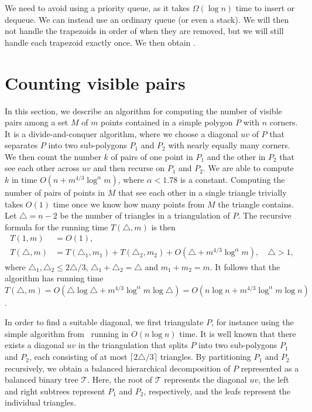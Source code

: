\documentclass{article}
\begin{document}
We need to avoid using a priority queue, as it takes $\Omega(\log n)$ time to insert or dequeue.
We can instead use an ordinary queue (or even a stack).
We will then not handle the trapezoids in order of when they are removed, but we will still handle each trapezoid exactly once.
We then obtain .

\section{Counting visible pairs}\label{sec:vispairs}

In this section, we describe an algorithm for computing the number of visible pairs among a set $M$ of $m$ points contained in a simple polygon $P$ with $n$ corners.
It is a divide-and-conquer algorithm, where we choose a diagonal $uv$ of $P$ that separates $P$ into two sub-polygons $P_1$ and $P_2$ with nearly equally many corners.
We then count the number $k$ of pairs of one point in $P_1$ and the other in $P_2$ that see each other across $uv$ and then recurse on $P_1$ and $P_2$.
We are able to compute $k$ in time $O(n+m^{4/3}\log^\alpha m)$, where $\alpha<1.78$ is a constant.
Computing the number of pairs of points in $M$ that see each other in a single triangle trivially takes $O(1)$ time once we know how many points from $M$ the triangle contains.
Let $\triangle=n-2$ be the number of triangles in a triangulation of $P$.
The recursive formula for the running time $T(\triangle,m)$ is then
\begin{align*}
T(1,m) & =O(1), \\
T(\triangle,m)&=T(\triangle_1,m_1)+T(\triangle_2,m_2)+O(\triangle+m^{4/3}\log^\alpha m), \quad \triangle>1,
\end{align*}
where $\triangle_1,\triangle_2\leq 2\triangle/3$, $\triangle_1+\triangle_2=\triangle$ and $m_1+m_2=m$.
It follows that the algorithm has running time $T(\triangle,m)=O(\triangle\log \triangle+m^{4/3}\log^\alpha m\log \triangle)=O(n\log n+m^{4/3}\log^\alpha m\log n)$.

In order to find a suitable diagonal, we first triangulate $P$, for instance using the simple algorithm from~\cite{DBLP:books/lib/BergCKO08} running in $O(n \log n)$ time.
It is well known that there exists a diagonal $uv$ in the triangulation that splits $P$ into two sub-polygons $P_1$ and $P_2$, each consisting of at most $\lceil 2\triangle/3\rceil$ triangles.
By partitioning $P_1$ and $P_2$ recursively, we obtain a balanced hierarchical decomposition of $P$ represented as a balanced binary tree $\mathcal T$.
Here, the root of $\mathcal T$ represents the diagonal $uv$, the left and right subtrees represent $P_1$ and $P_2$, respectively, and the leafs represent the individual triangles.
\end{document}
